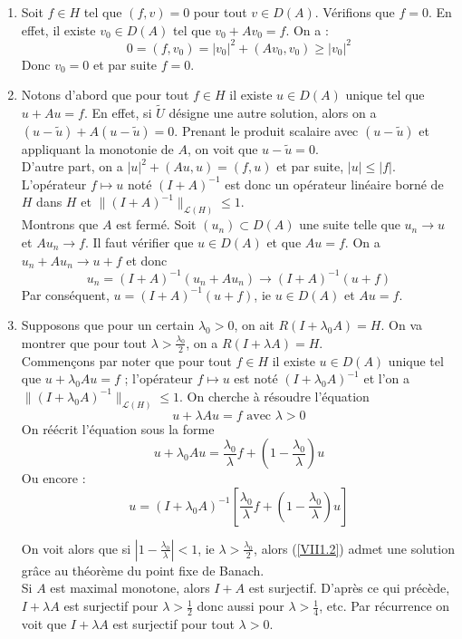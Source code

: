 \begin{dem} \begin{enumerate}
	\item Soit $f\in H$ tel que $(f,v)=0$ pour tout $v\in D(A)$. Vérifions que $f=0$. En effet, il existe $v_0\in D(A)$ tel que $v_0+Av_0=f$. On a :
	\[0=(f,v_0)=|v_0|^2+(Av_0,v_0)\geq |v_0|^2\]
Donc $v_0=0$ et par suite $f=0$.

	\item Notons d'abord que pour tout $f\in H$ il existe $u\in D(A)$ unique tel que $u+Au=f$. En effet, si $\tilde{U}$ désigne une autre solution, alors on a $(u-\tilde{u})+A(u-\tilde{u})=0$. Prenant le produit scalaire avec $(u-\tilde{u})$ et appliquant la monotonie de $A$, on voit que $u-\tilde{u}=0$.\\
D'autre part, on a $|u|^2+(Au,u)=(f,u)$ et par suite, $|u|\leq |f|$. L'opérateur $f\mapsto u$ noté $(I+A)^{-1}$ est donc un opérateur linéaire borné de $H$ dans $H$ et $\|(I+A)^{-1}\|_{\mathscr{L}(H)}\leq 1$.\\
Montrons que $A$ est fermé. Soit $(u_n)\subset D(A)$ une suite telle que $u_n\to u$ et $Au_n\to f$. Il faut vérifier que $u\in D(A)$ et que $Au=f$. On a $u_n+Au_n\to u+f$ et donc
	\[u_n=(I+A)^{-1}(u_n+Au_n)\to(I+A)^{-1}(u+f)\]
Par conséquent, $u=(I+A)^{-1}(u+f)$, ie $u\in D(A)$ et $Au=f$.

	\item Supposons que pour un certain $\lambda_0>0$, on ait $R(I+\lambda_0 A)=H$. On va montrer que pour tout $\lambda>\frac{\lambda_0}{2}$, on a $R(I+\lambda A)=H$. \\
Commençons par noter que pour tout $f\in H$ il existe $u\in D(A)$ unique tel que $u+\lambda_0 Au=f$ ; l'opérateur $f\mapsto u$ est noté $(I+\lambda_0A)^{-1}$ et l'on a $\|(I+\lambda_0A)^{-1}\|_{\mathscr{L}(H)}\leq 1$. On cherche à résoudre l'équation
\[u+\lambda Au=f \text{ avec } \lambda >0\]
On réécrit l'équation sous la forme
	\[u+\lambda_0Au=\frac{\lambda_0}{\lambda}f+\left(1-\frac{\lambda_0}{\lambda}\right)u\]
Ou encore :
\begin{equation} \label{VII1.2} u=(I+\lambda_0 A)^{-1}\left[\frac{\lambda_0}{\lambda}f+\left( 1-\frac{\lambda_0}{\lambda}\right)u \right] \end{equation}

On voit alors que si $\left| 1-\frac{\lambda_0}{\lambda}\right|<1$, ie $\lambda>\frac{\lambda_0}{2}$, alors (\ref{VII1.2}) admet une solution grâce au théorème du point fixe de Banach.\\
Si $A$ est maximal monotone, alors $I+A$ est surjectif. D'après ce qui précède, $I+\lambda A$ est surjectif pour $\lambda>\frac{1}{2}$ donc aussi pour $\lambda>\frac{1}{4}$, etc. Par récurrence on voit que $I+\lambda A$ est surjectif pour tout $\lambda>0$.
\end{enumerate}\end{dem}

